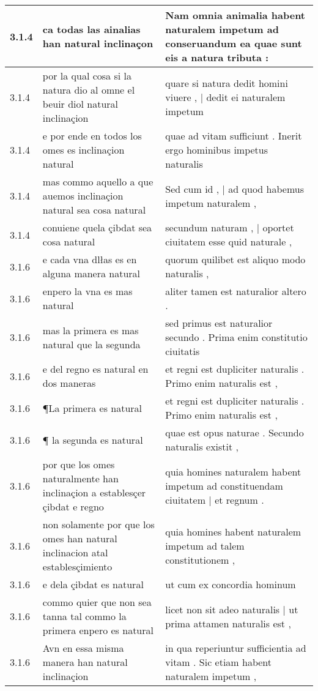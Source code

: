 \begin{tabular}{|p{1cm}|p{6.5cm}|p{6.5cm}|}
3.1.4 & ca todas las ainalias han natural inclinaçon & Nam omnia animalia habent naturalem impetum ad conseruandum ea quae sunt eis a natura tributa : \\\hline
3.1.4 & por la qual cosa si la natura dio al omne el beuir diol natural inclinaçion & quare si natura dedit homini viuere , | dedit ei naturalem impetum \\\hline
3.1.4 & e por ende en todos los omes es inclinaçion natural & quae ad vitam sufficiunt . Inerit ergo hominibus impetus naturalis \\\hline
3.1.4 & mas commo aquello a que auemos inclinaçion natural sea cosa natural & Sed cum id , | ad quod habemus impetum naturalem , \\\hline
3.1.4 & conuiene quela çibdat sea cosa natural & secundum naturam , | oportet ciuitatem esse quid naturale , \\\hline
3.1.6 & e cada vna dlłas es en alguna manera natural & quorum quilibet est aliquo modo naturalis , \\\hline
3.1.6 & enpero la vna es mas natural & aliter tamen est naturalior altero . \\\hline
3.1.6 & mas la primera es mas natural que la segunda & sed primus est naturalior secundo . Prima enim constitutio ciuitatis \\\hline
3.1.6 & e del regno es natural en dos maneras & et regni est dupliciter naturalis . Primo enim naturalis est , \\\hline
3.1.6 & ¶La primera es natural & et regni est dupliciter naturalis . Primo enim naturalis est , \\\hline
3.1.6 & ¶ la segunda es natural & quae est opus naturae . Secundo naturalis existit , \\\hline
3.1.6 & por que los omes naturalmente han inclinaçion a establesçer çibdat e regno & quia homines naturalem habent impetum ad constituendam ciuitatem | et regnum . \\\hline
3.1.6 & non solamente por que los omes han natural inclinacion atal establesçimiento & quia homines habent naturalem impetum ad talem constitutionem , \\\hline
3.1.6 & e dela çibdat es natural & ut cum ex concordia hominum \\\hline
3.1.6 & commo quier que non sea tanna tal commo la primera enpero es natural & licet non sit adeo naturalis | ut prima attamen naturalis est , \\\hline
3.1.6 & Avn en essa misma manera han natural inclinaçion & in qua reperiuntur sufficientia ad vitam . Sic etiam habent naturalem impetum , \\\hline

\end{tabular}
